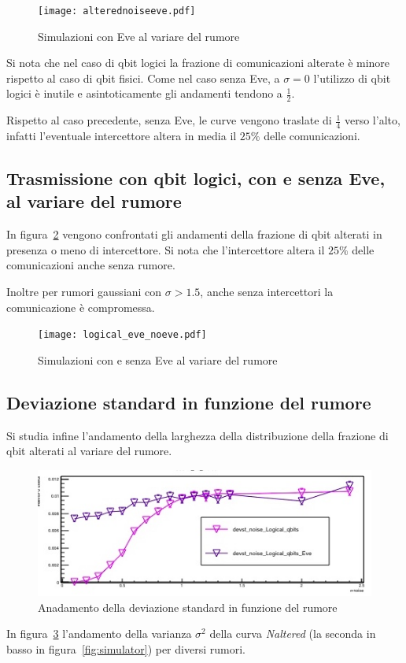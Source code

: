 \documentclass[11 pt, a4paper]{article}
\begin{document}
\begin{figure}[htb!]
\centering
\texttt{[image: alterednoiseeve.pdf]}
\caption{Simulazioni con Eve al variare del rumore}
\label{fig:alteredvsnoiseeve}
\end{figure}
Si nota che nel caso di qbit logici la frazione di comunicazioni alterate è minore rispetto al caso di qbit fisici.
Come nel caso senza Eve, a $\sigma=0$ l'utilizzo di qbit logici è inutile e asintoticamente gli andamenti tendono a $\frac{1}{2}$.

Rispetto al caso precedente, senza Eve, le curve vengono traslate di $\frac{1}{4}$ verso l'alto, infatti l'eventuale intercettore altera in media il $25\%$ delle comunicazioni.

\newpage
\subsection{Trasmissione con qbit logici, con e senza Eve, al variare del rumore}
In figura~\ref{fig:locical_eve_noeve} vengono confrontati gli andamenti della frazione di qbit alterati in presenza o meno di intercettore. Si nota che l'intercettore altera il $25\%$ delle comunicazioni anche senza rumore.

Inoltre per rumori gaussiani con $\sigma>1.5$, anche senza intercettori la comunicazione è compromessa.

\begin{figure}[htb!]
\centering
\texttt{[image: logical\_eve\_noeve.pdf]}
\caption{Simulazioni con e senza Eve al variare del rumore}
\label{fig:locical_eve_noeve}
\end{figure}

\subsection{Deviazione standard in funzione del rumore}
Si studia infine l'andamento della larghezza della distribuzione della frazione di qbit alterati al variare del rumore.

\begin{figure}
\centering
\includegraphics[width=0.9\linewidth]{devstVsNoise.jpeg}
\caption{Anadamento della deviazione standard in funzione del rumore}
\label{fig:devstVsNoise}
\end{figure}

In figura~\ref{fig:devstVsNoise} l'andamento della varianza $\sigma^2$ della curva \textit{Naltered} (la seconda in basso in figura~\ref{fig:simulator}) per diversi rumori.
\end{document}
